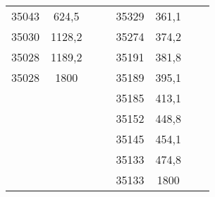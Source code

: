 \documentclass[11pt]{article}
\begin{document}
{{\begin{tabular}{|c|c|c|c|c|c|c|c|}
            \cline{1-2} \cline{5-6} 
            35043 & 624,5 & \multicolumn{1}{c}{} &  & 35329 & 361,1 & \multicolumn{1}{c}{} & \multicolumn{1}{c}{}\tabularnewline
            \cline{1-2} \cline{5-6} 
            35030 & 1128,2 & \multicolumn{1}{c}{} &  & 35274 & 374,2 & \multicolumn{1}{c}{} & \multicolumn{1}{c}{}\tabularnewline
            \cline{1-2} \cline{5-6} 
            35028 & 1189,2 & \multicolumn{1}{c}{} &  & 35191 & 381,8 & \multicolumn{1}{c}{} & \multicolumn{1}{c}{}\tabularnewline
            \cline{1-2} \cline{5-6} 
            35028 & 1800 & \multicolumn{1}{c}{} &  & 35189 & 395,1 & \multicolumn{1}{c}{} & \multicolumn{1}{c}{}\tabularnewline
            \cline{1-2} \cline{5-6} 
            \multicolumn{1}{c}{} & \multicolumn{1}{c}{} & \multicolumn{1}{c}{} &  & 35185 & 413,1 & \multicolumn{1}{c}{} & \multicolumn{1}{c}{}\tabularnewline
            \cline{5-6} 
            \multicolumn{1}{c}{} & \multicolumn{1}{c}{} & \multicolumn{1}{c}{} &  & 35152 & 448,8 & \multicolumn{1}{c}{} & \multicolumn{1}{c}{}\tabularnewline
            \cline{5-6} 
            \multicolumn{1}{c}{} & \multicolumn{1}{c}{} & \multicolumn{1}{c}{} &  & 35145 & 454,1 & \multicolumn{1}{c}{} & \multicolumn{1}{c}{}\tabularnewline
            \cline{5-6} 
            \multicolumn{1}{c}{} & \multicolumn{1}{c}{} & \multicolumn{1}{c}{} &  & 35133 & 474,8 & \multicolumn{1}{c}{} & \multicolumn{1}{c}{}\tabularnewline
            \cline{5-6} 
            \multicolumn{1}{c}{} & \multicolumn{1}{c}{} & \multicolumn{1}{c}{} &  & 35133 & 1800 & \multicolumn{1}{c}{} & \multicolumn{1}{c}{}\tabularnewline
            \cline{5-6} 
        \end{tabular}
    }
}
\vspace*{\fill}\vspace*{\fill}
\end{document}

